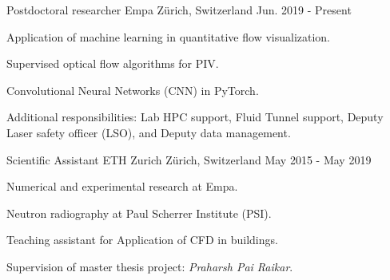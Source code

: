 \documentclass[11pt, a4paper]{awesome-cv}
\begin{document}
\begin{cventries}

  \cventry
    {Postdoctoral researcher} %
    {Empa} %
    {Z\"urich, Switzerland} %
    {Jun. 2019 - Present} %
    {
      \begin{cvitems} %
        \item {Application of machine learning in quantitative flow visualization.}
        \item {Supervised optical flow algorithms for PIV.}
        \item {Convolutional Neural Networks (CNN) in PyTorch.}
        \item {Additional responsibilities: Lab HPC support, Fluid Tunnel support, Deputy Laser safety officer (LSO), and Deputy data management.}
      \end{cvitems}
    }

  \cventry
    {Scientific Assistant} %
    {ETH Zurich} %
    {Z\"urich, Switzerland} %
    {May 2015 - May 2019} %
    {
      \begin{cvitems} %
        \item {Numerical and experimental research at Empa.}
        \item {Neutron radiography at Paul Scherrer Institute (PSI).}
        \item {Teaching assistant for Application of CFD in buildings.}
        \item {Supervision of master thesis project: \textit{Praharsh Pai Raikar}.}
      \end{cvitems}
    }

\end{cventries}



\end{document}
